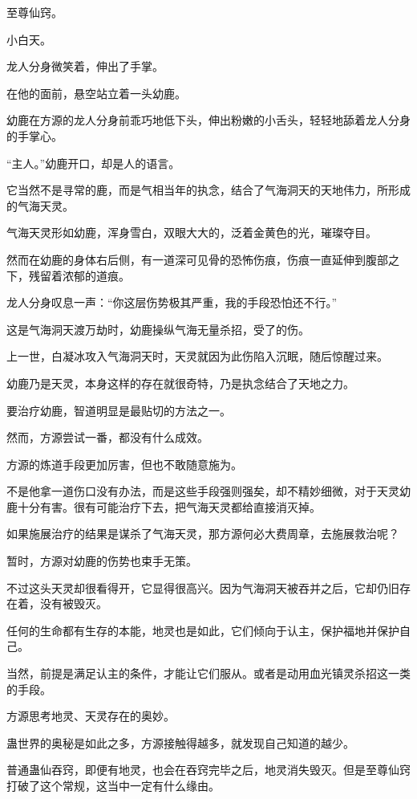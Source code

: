 
\begin{this_body}

至尊仙窍。

小白天。

龙人分身微笑着，伸出了手掌。

在他的面前，悬空站立着一头幼鹿。

幼鹿在方源的龙人分身前乖巧地低下头，伸出粉嫩的小舌头，轻轻地舔着龙人分身的手掌心。

“主人。”幼鹿开口，却是人的语言。

它当然不是寻常的鹿，而是气相当年的执念，结合了气海洞天的天地伟力，所形成的气海天灵。

气海天灵形如幼鹿，浑身雪白，双眼大大的，泛着金黄色的光，璀璨夺目。

然而在幼鹿的身体右后侧，有一道深可见骨的恐怖伤痕，伤痕一直延伸到腹部之下，残留着浓郁的道痕。

龙人分身叹息一声：“你这层伤势极其严重，我的手段恐怕还不行。”

这是气海洞天渡万劫时，幼鹿操纵气海无量杀招，受了的伤。

上一世，白凝冰攻入气海洞天时，天灵就因为此伤陷入沉眠，随后惊醒过来。

幼鹿乃是天灵，本身这样的存在就很奇特，乃是执念结合了天地之力。

要治疗幼鹿，智道明显是最贴切的方法之一。

然而，方源尝试一番，都没有什么成效。

方源的炼道手段更加厉害，但也不敢随意施为。

不是他拿一道伤口没有办法，而是这些手段强则强矣，却不精妙细微，对于天灵幼鹿十分有害。很有可能治疗下去，把气海天灵都给直接消灭掉。

如果施展治疗的结果是谋杀了气海天灵，那方源何必大费周章，去施展救治呢？

暂时，方源对幼鹿的伤势也束手无策。

不过这头天灵却很看得开，它显得很高兴。因为气海洞天被吞并之后，它却仍旧存在着，没有被毁灭。

任何的生命都有生存的本能，地灵也是如此，它们倾向于认主，保护福地并保护自己。

当然，前提是满足认主的条件，才能让它们服从。或者是动用血光镇灵杀招这一类的手段。

方源思考地灵、天灵存在的奥妙。

蛊世界的奥秘是如此之多，方源接触得越多，就发现自己知道的越少。

普通蛊仙吞窍，即便有地灵，也会在吞窍完毕之后，地灵消失毁灭。但是至尊仙窍打破了这个常规，这当中一定有什么缘由。


\end{this_body}
